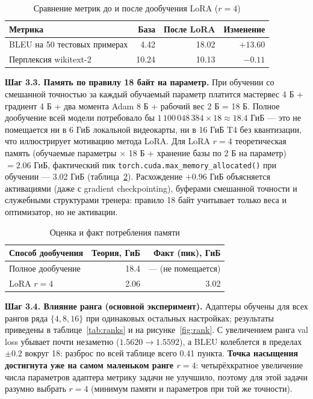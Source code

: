 \documentclass[14pt,a4paper]{extarticle}
\begin{document}
\begin{table}[H]
    \centering
    \caption*{\raggedleft Сравнение метрик до и после дообучения LoRA ($r=4$)}
    \label{tab:forget}
    \begin{tabular}{lrrr}
        \toprule
        Метрика & База & После LoRA & Изменение \\
        \midrule
        BLEU на 50 тестовых примерах & 4.42 & 18.02 & $+13.60$ \\
        Перплексия wikitext-2 & 10.24 & 10.13 & $-0.11$ \\
        \bottomrule
    \end{tabular}
\end{table}

\textbf{Шаг 3.3. Память по правилу 18 байт на параметр.} При обучении со смешанной
точностью за каждый обучаемый параметр платится мастервес 4 Б + градиент 4 Б +
два момента Adam 8 Б + рабочий вес 2 Б = 18 Б. Полное дообучение всей модели
потребовало бы $1\,100\,048\,384 \times 18 \approx 18.4$ ГиБ --- это не помещается
ни в 6 ГиБ локальной видеокарты, ни в 16 ГиБ T4 без квантизации, что иллюстрирует
мотивацию метода LoRA. Для LoRA $r=4$ теоретическая память (обучаемые параметры
$\times$ 18 Б + хранение базы по 2 Б на параметр) $= 2.06$ ГиБ, фактический пик
\texttt{torch.cuda.max\_memory\_allocated()} при обучении --- 3.02 ГиБ
(таблица~\ref{tab:mem}). Расхождение $+0.96$ ГиБ объясняется активациями (даже с
gradient checkpointing), буферами смешанной точности и служебными структурами
тренера: правило 18 байт учитывает только веса и оптимизатор, но не активации.

\begin{table}[H]
    \centering
    \caption*{\raggedleft Оценка и факт потребления памяти}
    \label{tab:mem}
    \begin{tabular}{lrr}
        \toprule
        Способ дообучения & Теория, ГиБ & Факт (пик), ГиБ \\
        \midrule
        Полное дообучение & 18.4 & --- (не помещается) \\
        LoRA $r=4$ & 2.06 & 3.02 \\
        \bottomrule
    \end{tabular}
\end{table}

\textbf{Шаг 3.4. Влияние ранга (основной эксперимент).} Адаптеры обучены для всех
рангов ряда $\{4, 8, 16\}$ при одинаковых остальных настройках; результаты приведены
в таблице~\ref{tab:ranks} и на рисунке~\ref{fig:rank}. С увеличением ранга val loss
убывает почти незаметно ($1.5620 \to 1.5592$), а BLEU колеблется в пределах $\pm 0.2$
вокруг 18: разброс по всей таблице всего 0.41 пункта. \textbf{Точка насыщения
достигнута уже на самом маленьком ранге $r=4$}: четырёхкратное увеличение числа
параметров адаптера метрику задачи не улучшило, поэтому для этой задачи разумно
выбрать $r=4$ (минимум памяти и параметров при той же точности).
\end{document}

